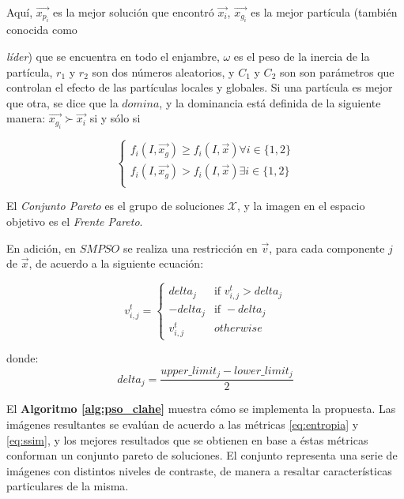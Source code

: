 \documentclass[spanish,twocolumn]{article}
\begin{document}
Aquí, $\overrightarrow{x_{p_i}}$ es la mejor solución que encontró $\overrightarrow{x_i}$, $\overrightarrow{x_{g_i}}$ es la mejor partícula (también conocida como {{\it líder}) que se encuentra en todo el enjambre, $\omega$ es el peso de la inercia de la partícula, $r_1$ y $r_2$ son dos números aleatorios, y $C_1$ y $C_2$ son son parámetros que controlan el efecto de las partículas locales  y globales. Si una partícula es mejor que otra, se dice que la $domina$, y la dominancia está definida de la siguiente manera: $\overrightarrow{x_{g_i}} \succ \overrightarrow{x_i}$ si y sólo si

\begin{equation}\label{eq:dominanciapareto}
         \begin{cases}  f_i(I,\overrightarrow{x_{g}})  \geq f_i(I,\overrightarrow{x}) \forall i \in \{1,2\} \\
                        f_i(I,\overrightarrow{x_{g}}) > f_i(I,\overrightarrow{x}) \exists i \in \{1,2\} \\
         \end{cases}
\end{equation}

El {\it Conjunto Pareto} es el grupo de soluciones $\mathscr{X}$, y la imagen en el espacio objetivo es el {\it Frente Pareto}.

En adición, en $SMPSO$ se realiza una restricción en $\overrightarrow{v}$, para cada componente $j$ de $\overrightarrow{x}$, de acuerdo a la siguiente ecuación: 
                
\begin{equation}\label{eq:restricciondelta}
    v_{i,j}^t = \begin{cases}  delta_j &\mbox{if } v_{i,j}^t > delta_j \\
                                -delta_j & \mbox{if } -delta_j \\
                                v_{i,j}^t & otherwise \end{cases}
\end{equation}

donde: 
\begin{equation} \label{eq:restricciondelta2}
delta_j= \frac{upper\_limit_j - lower\_limit_j}{2}
\end{equation}

El \textbf{Algoritmo \ref{alg:pso_clahe}} muestra cómo se implementa la propuesta. Las imágenes resultantes se evalúan de acuerdo a las métricas \eqref{eq:entropia} y \eqref{eq:ssim}, y los mejores resultados que se obtienen en base a éstas métricas conforman un conjunto pareto de soluciones. El conjunto representa una serie de imágenes con distintos niveles de contraste, de manera a resaltar características particulares de la misma.

}
\end{document}

